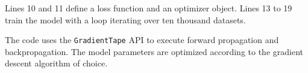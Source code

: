 Lines 10 and 11 define a loss function and an optimizer object.  
Lines 13 to 19 train the model with a loop iterating over ten
thousand datasets.
\begin{inred}
The code uses the {\tt GradientTape} API to execute forward propagation
and backpropagation.
The model parameters are optimized according to the gradient descent algorithm
of choice.
\end{inred}

